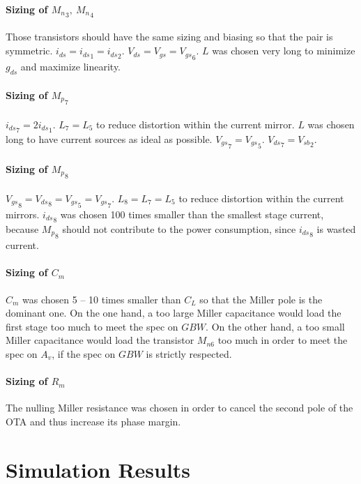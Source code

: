 \documentclass[english,10pt]{article}
\begin{document}
\paragraph{Sizing of ${M_{n}}_3, \:{M_{n}}_4$}
Those transistors should have the same sizing and biasing so that the pair is symmetric.
${i_{ds}} = {i_{ds}}_1 = {i_{ds}}_2$.
${V_{ds}} = {V_{gs}} = {V_{gs}}_6$.
$L$ was chosen very long to minimize $g_{ds}$ and maximize linearity.

\paragraph{Sizing of ${M_{p}}_7$}
${i_{ds}}_7 = 2 {i_{ds}}_1$.
$L_7 = L_5$ to reduce distortion within the current mirror. $L$ was chosen long to have current sources as ideal as possible.
${V_{gs}}_7 = {V_{gs}}_5$.
${V_{ds}}_7 = {V_{sb}}_2$.

\paragraph{Sizing of ${M_{p}}_8$}
${V_{gs}}_8 = {V_{ds}}_8 = {V_{gs}}_5 = {V_{gs}}_7$.
$L_8 = L_7 = L_5$ to reduce distortion within the current mirrors.
${i_{ds}}_8$ was chosen 100 times smaller than the smallest stage current, because ${M_{p}}_8$ should not contribute to the power consumption, since ${i_{ds}}_8$ is wasted current.

\paragraph{Sizing of $C_{m}$}
$C_{m}$ was chosen 5 -- 10 times smaller than $C_L$ so that the Miller pole is the dominant one. On the one hand, a too large Miller capacitance would load the first stage too much to meet the spec on $GBW$. On the other hand, a too small Miller capacitance would load the transistor $M_{n6}$ too much in order to meet the spec on $A_v$, if the spec on $GBW$ is strictly respected.

\paragraph{Sizing of $R_{m}$}
The nulling Miller resistance was chosen in order to cancel the second pole of the OTA and thus increase its phase margin.

\section{Simulation Results}
\end{document}
